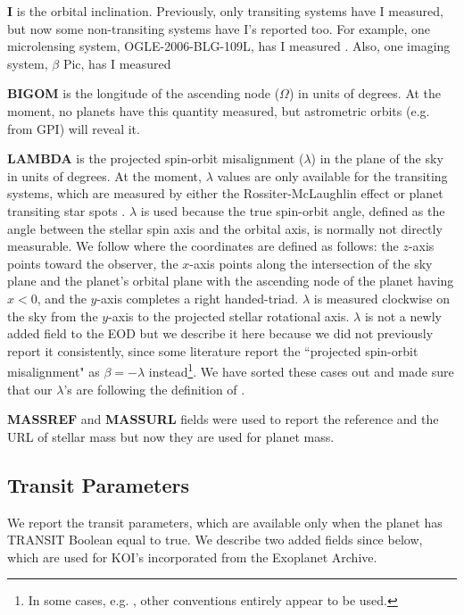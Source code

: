 \documentclass[11pt,preprint]{aastex}
\begin{document}
\begin{CJK*}{UTF8}{gbsn}
{\bf I} is the orbital inclination. Previously, only transiting
systems have I measured, but now some non-transiting systems
have I's reported too. For example, one microlensing system,
OGLE-2006-BLG-109L, has I measured \citep{Bennett2010}. Also, one imaging system, $\beta$ Pic, has I measured \citep{Lagrange2009}

{\bf BIGOM} is the longitude of the ascending node ($\Omega$) in units of degrees. At the moment, no planets have this quantity measured, but astrometric orbits (e.g. from GPI) will reveal it.

{\bf LAMBDA} is the projected spin-orbit misalignment ($\lambda$) in
the plane of the sky in units of degrees. At the moment, $\lambda$
values are only available for the transiting systems, which are
measured by either the Rossiter-McLaughlin effect
\citep[e.g.,][]{Winn2005} or planet transiting star spots
\citep[e.g.,][]{Sanchis-Ojeda2012}. $\lambda$ is used because
the true spin-orbit angle, defined as the angle between the
stellar spin axis and the orbital axis, is normally not directly
measurable. We follow \cite{Fabrycky2009} where the coordinates are defined as follows: the
$z$-axis points toward the observer, the $x$-axis points along the
intersection of the sky plane and the planet's orbital plane with the
ascending node of the planet having $x<0$, and the $y$-axis completes
a right handed-triad. $\lambda$ is measured clockwise on the sky from
the $y$-axis to the projected stellar rotational axis. $\lambda$ is
not a newly added field to the EOD but we describe it here because we did not
previously report it consistently, since some literature report the ``projected
spin-orbit misalignment" as $\beta = -\lambda$ instead\footnote{In some cases, e.g. \cite{Moutou2011}, other conventions entirely appear to be used.}. We have sorted
these cases out and made sure that our $\lambda$'s are following the
definition of \cite{Fabrycky2009}.

{\bf MASSREF} and {\bf MASSURL} fields were used to report the
reference and the URL of stellar mass but now they are used for planet
mass.

\subsection{Transit Parameters}\label{sec:transit}

We report the transit parameters, which are available only when the
planet has TRANSIT Boolean equal to true. We describe two added fields since
\cite{Wright2011} below, which are used for KOI's incorporated from the Exoplanet Archive.


\end{CJK*}
\end{document}
